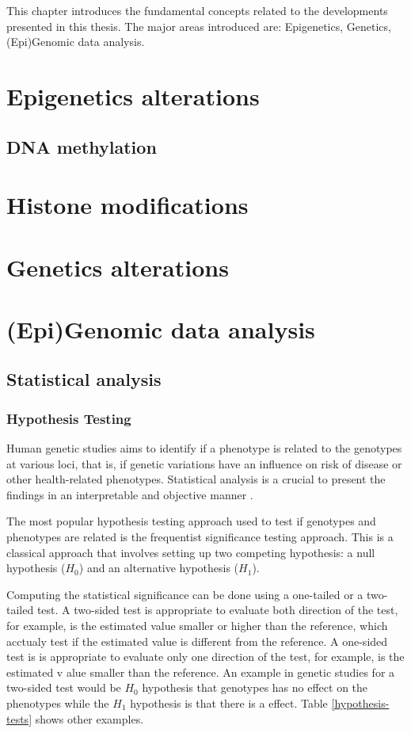 This chapter introduces the fundamental concepts related to the developments presented in this thesis. The major areas introduced are: Epigenetics, Genetics, (Epi)Genomic data analysis.


\section{Epigenetics alterations}
\subsection{DNA methylation}
\section{Histone modifications}

\section{Genetics alterations}


\section{(Epi)Genomic data analysis}

\subsection{Statistical analysis}

\subsubsection{Hypothesis Testing}

Human genetic studies aims to identify if a phenotype is related to the genotypes
at various loci, that is, if genetic variations have an influence on risk of
disease or other health-related phenotypes.
Statistical analysis is a crucial to present the findings in an
interpretable and objective manner \cite{sham2014statistical}.

The most popular hypothesis testing approach used to test if
genotypes and phenotypes are related  is the frequentist significance testing approach.
This is a classical approach that involves setting up two competing hypothesis: a
null hypothesis ($H_0$) and an alternative hypothesis ($H_1$).

Computing the statistical significance can be done using a one-tailed or a two-tailed test.
A two-sided test is appropriate to evaluate both direction of the test, for example,
is the estimated value smaller or higher than the reference, which acctualy test if the
 estimated value is different from the reference.
A one-sided test is  is appropriate to evaluate only one direction of the test,
for example, is the estimated v alue smaller than the reference.
An example in genetic studies for a two-sided test would be $H_0$
hypothesis that genotypes has no effect on the phenotypes
while the $H_1$ hypothesis is that there is a effect.
Table \ref{hypothesis-tests} shows other examples.

